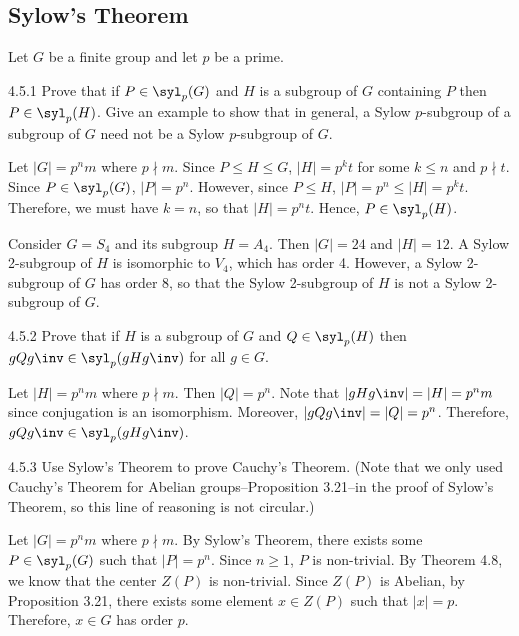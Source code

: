 \subsection{Sylow's Theorem}

Let $G$ be a finite group and let $p$ be a prime.

\begin{exercise}{4.5.1}
	Prove that if $P \in \syl_p(G)$ and $H$ is a subgroup of $G$ containing $P$ then $P \in \syl_p(H)$.
	Give an example to show that in general, a Sylow $p$-subgroup of a subgroup of $G$ need not be a Sylow $p$-subgroup of $G$.
\end{exercise}

\begin{sol}
	Let $|G| = p^n m$ where $p \nmid m$.
	Since $P \leq H \leq G$, $|H| = p^k t$ for some $k \leq n$ and $p \nmid t$.
	Since $P \in \syl_p(G)$, $|P| = p^n$.
	However, since $P \leq H$, $|P| = p^n \leq |H| = p^k t$.
	Therefore, we must have $k = n$, so that $|H| = p^n t$.
	Hence, $P \in \syl_p(H)$.

	Consider $G = S_4$ and its subgroup $H = A_4$.
	Then $|G| = 24$ and $|H| = 12$.
	A Sylow 2-subgroup of $H$ is isomorphic to $V_4$, which has order 4.
	However, a Sylow 2-subgroup of $G$ has order 8, so that the Sylow 2-subgroup of $H$ is not a Sylow 2-subgroup of $G$.
\end{sol}

\begin{exercise}{4.5.2}
	Prove that if $H$ is a subgroup of $G$ and $Q \in \syl_p(H)$ then $gQg\inv \in \syl_p(gHg\inv)$ for all $g \in G$.
\end{exercise}

\begin{sol}
	Let $|H| = p^n m$ where $p \nmid m$.
	Then $|Q| = p^n$.
	Note that $|gHg\inv| = |H| = p^n m$ since conjugation is an isomorphism.
	Moreover, $|gQg\inv| = |Q| = p^n$.
	Therefore, $gQg\inv \in \syl_p(gHg\inv)$.
\end{sol}

\begin{exercise}{4.5.3}
	Use Sylow's Theorem to prove Cauchy's Theorem. (Note that we only used Cauchy's Theorem for Abelian groups--Proposition 3.21--in the proof of Sylow's Theorem, so this line of reasoning is not circular.)
\end{exercise}

\begin{sol}
	Let $|G| = p^n m$ where $p \nmid m$.
	By Sylow's Theorem, there exists some $P \in \syl_p(G)$ such that $|P| = p^n$.
	Since $n \geq 1$, $P$ is non-trivial.
	By Theorem 4.8, we know that the center $Z(P)$ is non-trivial.
	Since $Z(P)$ is Abelian, by Proposition 3.21, there exists some element $x \in Z(P)$ such that $|x| = p$.
	Therefore, $x \in G$ has order $p$.
\end{sol}

